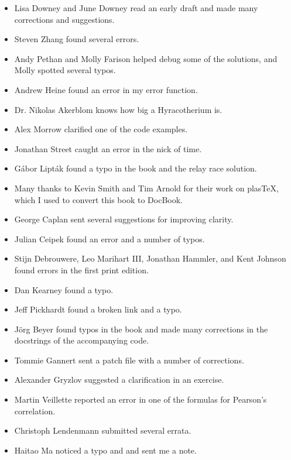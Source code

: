 \documentclass[12pt]{book}
\begin{document}
\small

\begin{itemize}

\item Lisa Downey and June Downey read an early draft and made many
corrections and suggestions.

\item Steven Zhang found several errors.

\item Andy Pethan and Molly Farison helped debug some of the solutions,
and Molly spotted several typos.

\item Andrew Heine found an error in my error function.

\item Dr. Nikolas Akerblom knows how big a Hyracotherium is.

\item Alex Morrow clarified one of the code examples.

\item Jonathan Street caught an error in the nick of time.

\item G\'{a}bor Lipt\'{a}k found a typo in the book and the relay race solution.

\item Many thanks to Kevin Smith and Tim Arnold for their work on
plasTeX, which I used to convert this book to DocBook.

\item George Caplan sent several suggestions for improving clarity.

\item Julian Ceipek found an error and a number of typos.

\item Stijn Debrouwere, Leo Marihart III, Jonathan Hammler, and Kent Johnson
found errors in the first print edition.

\item Dan Kearney found a typo.

\item Jeff Pickhardt found a broken link and a typo.

\item J\"{o}rg Beyer found typos in the book and made many corrections
in the docstrings of the accompanying code.

\item Tommie Gannert sent a patch file with a number of corrections.

\item Alexander Gryzlov suggested a clarification in an exercise.

\item Martin Veillette reported an error in one of the formulas for
Pearson's correlation.

\item Christoph Lendenmann submitted several errata.

\item Haitao Ma noticed a typo and and sent me a note.


\end{itemize}
\end{document}
